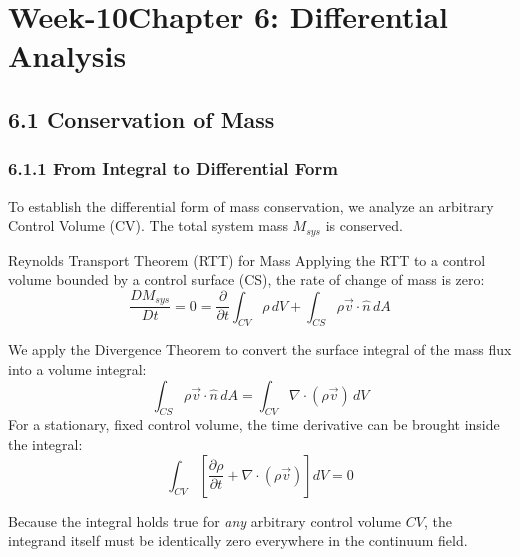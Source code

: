 \section{Week-10Chapter 6: Differential Analysis}

\subsection{6.1 Conservation of Mass}

\subsubsection{6.1.1 From Integral to Differential Form}
To establish the differential form of mass conservation, we analyze an arbitrary Control Volume (CV). The total system mass $M_{sys}$ is conserved.

\begin{eqbox}{Reynolds Transport Theorem (RTT) for Mass}
Applying the RTT to a control volume bounded by a control surface (CS), the rate of change of mass is zero:
\begin{equation*}
    \frac{DM_{sys}}{Dt} = 0 = \frac{\partial}{\partial t} \int_{CV} \rho \, dV + \int_{CS} \rho \vec{v} \cdot \hat{n} \, dA
\end{equation*}
\end{eqbox}

\begin{conceptbox}
We apply the Divergence Theorem to convert the surface integral of the mass flux into a volume integral:
\begin{equation*}
    \int_{CS} \rho \vec{v} \cdot \hat{n} \, dA = \int_{CV} \nabla \cdot (\rho \vec{v}) \, dV
\end{equation*}
For a stationary, fixed control volume, the time derivative can be brought inside the integral:
\begin{equation*}
    \int_{CV} \left[ \frac{\partial \rho}{\partial t} + \nabla \cdot (\rho \vec{v}) \right] dV = 0
\end{equation*}
\end{conceptbox}

\begin{notebox}
Because the integral holds true for \textit{any} arbitrary control volume $CV$, the integrand itself must be identically zero everywhere in the continuum field.
\end{notebox}

